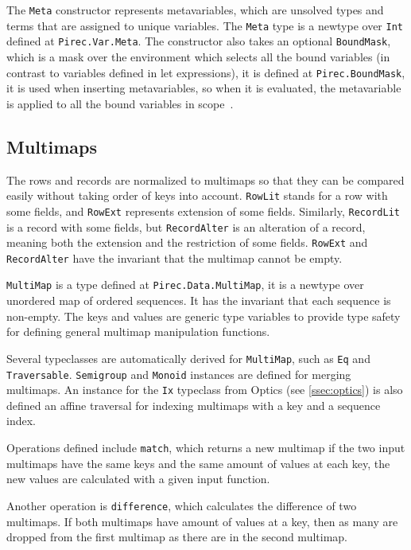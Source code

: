 The \texttt{Meta} constructor represents metavariables, which are
unsolved types and terms that are assigned to unique variables. The
\texttt{Meta} type is a newtype over \texttt{Int} defined at
\texttt{Pirec.Var.Meta}. The constructor also takes an optional
\texttt{BoundMask}, which is a mask over the environment which selects
all the bound variables (in contrast to variables defined in let expressions),
it is defined at \texttt{Pirec.BoundMask}, it is used when inserting
metavariables, so when it is evaluated, the metavariable is applied to all the
bound variables in scope~\cite{elabzoo}.

\subsection{Multimaps}\label{ssec:multimap}

The rows and records are normalized to multimaps so that they can be compared
easily without taking order of keys into account. \texttt{RowLit} stands
for a row with some fields, and \texttt{RowExt} represents extension of
some fields. Similarly, \texttt{RecordLit} is a record with some fields,
but \texttt{RecordAlter} is an alteration of a record, meaning both the
extension and the restriction of some fields. \texttt{RowExt} and
\texttt{RecordAlter} have the invariant that the multimap cannot be
empty.

\texttt{MultiMap} is a type defined at \texttt{Pirec.Data.MultiMap}, it
is a newtype over unordered map of ordered sequences. It has the invariant that
each sequence is non-empty. The keys and values are generic type variables to
provide type safety for defining general multimap manipulation functions.

Several typeclasses are automatically derived for \texttt{MultiMap},
such as \texttt{Eq} and \texttt{Traversable}.
\texttt{Semigroup} and \texttt{Monoid} instances are defined for
merging multimaps. An instance for the \texttt{Ix} typeclass from Optics
(see \cref{ssec:optics}) is also defined an affine traversal for indexing
multimaps with a key and a sequence index.

Operations defined include \texttt{match}, which returns a new multimap
if the two input multimaps have the same keys and the same amount of values at
each key, the new values are calculated with a given input function.

Another operation is \texttt{difference}, which calculates the
difference of two multimaps. If both multimaps have amount of values at a key,
then as many are dropped from the first multimap as there are in the second
multimap.

